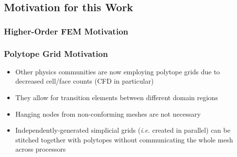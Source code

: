 \documentclass[compress,10pt]{beamer}
\begin{document}
\subsection{Motivation for this Work}
\typeout{***********************************************************************************}
\begin{frame}[t]\frametitle{Higher-Order FEM Motivation}

\end{frame}
\begin{frame}[t]\frametitle{Polytope Grid Motivation}
         \begin{block}{}{\footnotesize
			\begin{itemize}
				\item <1-> Other physics communities are now employing polytope grids due to decreased cell/face counts (CFD in particular)
				\item <2-> They allow for transition elements between different domain regions
				\item <3-> Hanging nodes from non-conforming meshes are not necessary
				\item <4-> Independently-generated simplicial grids ({\em i.e.} created in parallel) can be stitched together with polytopes without communicating the whole mesh across processors
			\end{itemize}}
         \end{block}
\vspace{0.5cm}
\centering
{}
\end{frame}
\end{document}
